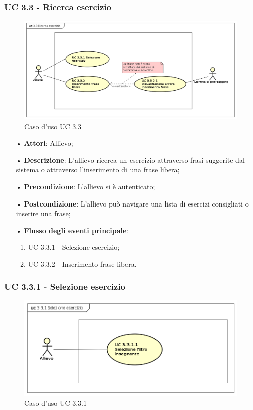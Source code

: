\subsubsection{UC 3.3 - Ricerca esercizio}
\begin{figure}[H]
\centering
\includegraphics[width=17cm]{img/UC33.png} 
\caption{Caso d'uso UC 3.3}\label{fig:33}
\end{figure}
\begin{itemize}
\item[•]\textbf{Attori}: Allievo;
\item[•]\textbf{Descrizione}: L'allievo ricerca un esercizio attraverso frasi suggerite dal sistema o attraverso l'inserimento di una frase libera;
\item[•]\textbf{Precondizione}: L'allievo si è autenticato;
\item[•]\textbf{Postcondizione}: L'allievo può navigare una lista di esercizi consigliati o inserire una frase;
\item[•]\textbf{Flusso degli eventi principale}:
\begin{enumerate}
\item UC 3.3.1 - Selezione esercizio;
\item UC 3.3.2 - Inserimento frase libera.
\end{enumerate}
\end{itemize}

\subsubsection{UC 3.3.1 - Selezione esercizio}

\begin{figure}
\centering
\includegraphics[width=17cm]{img/UC331.png} 
\caption{Caso d'uso UC 3.3.1}\label{fig:331}
\end{figure}

